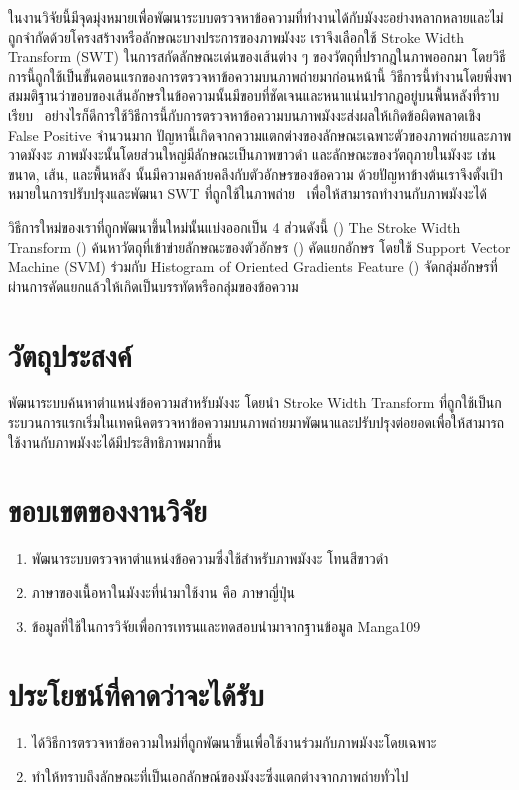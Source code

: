ในงานวิจัยนี้มีจุดมุ่งหมายเพื่อพัฒนาระบบตรวจหาข้อความที่ทำงานได้กับมังงะอย่างหลากหลายและไม่ถูกจำกัดด้วยโครงสร้างหรือลักษณะบางประการของภาพมังงะ เราจึงเลือกใช้ Stroke Width Transform (SWT) ในการสกัดลักษณะเด่นของเส้นต่าง ๆ ของวัตถุที่ปรากฎในภาพออกมา โดยวิธีการนี้ถูกใช้เป็นขั้นตอนแรกของการตรวจหาข้อความบนภาพถ่ายมาก่อนหน้านี้ วิธีการนี้ทำงานโดยพึ่งพาสมมติฐานว่าขอบของเส้นอักษรในข้อความนั้นมีขอบที่ชัดเจนและหนาแน่นปรากฏอยู่บนพื้นหลังที่ราบเรียบ~\cite{5540041} อย่างไรก็ดีการใช้วิธีการนี้กับการตรวจหาข้อความบนภาพมังงะส่งผลให้เกิดข้อผิดพลาดเชิง False Positive จำนวนมาก ปัญหานี้เกิดจากความแตกต่างของลักษณะเฉพาะตัวของภาพถ่ายและภาพวาดมังงะ ภาพมังงะนั้นโดยส่วนใหญ่มีลักษณะเป็นภาพขาวดำ และลักษณะของวัตถุภายในมังงะ เช่น ขนาด, เส้น, และพื้นหลัง นั้นมีความคล้ายคลึงกับตัวอักษรของข้อความ ด้วยปัญหาข้างต้นเราจึงตั้งเป้าหมายในการปรับปรุงและพัฒนา SWT ที่ถูกใช้ในภาพถ่าย~\cite{5540041} เพื่อให้สามารถทำงานกับภาพมังงะได้

วิธีการใหม่ของเราที่ถูกพัฒนาขึ้นใหม่นั้นแบ่งออกเป็น 4 ส่วนดังนี้ () The Stroke Width Transform () ค้นหาวัตถุที่เข้าข่ายลักษณะของตัวอักษร () คัดแยกอักษร โดยใช้ Support Vector Machine (SVM) ร่วมกับ Histogram of Oriented Gradients Feature () จัดกลุ่มอักษรที่ผ่านการคัดแยกแล้วให้เกิดเป็นบรรทัดหรือกลุ่มของข้อความ

\section{วัตถุประสงค์}
พัฒนาระบบค้นหาตำแหน่งข้อความสำหรับมังงะ โดยนำ Stroke Width Transform ที่ถูกใช้เป็นกระบวนการแรกเริ่มในเทคนิคตรวจหาข้อความบนภาพถ่ายมาพัฒนาและปรับปรุงต่อยอดเพื่อให้สามารถใช้งานกับภาพมังงะได้มีประสิทธิภาพมากขึ้น

\section{ขอบเขตของงานวิจัย}
\begin{enumerate}
    \item พัฒนาระบบตรวจหาตำแหน่งข้อความซึ่งใช้สำหรับภาพมังงะ โทนสีขาวดำ
    \item ภาษาของเนื้อหาในมังงะที่นำมาใช้งาน คือ ภาษาญี่ปุ่น
    \item ข้อมูลที่ใช้ในการวิจัยเพื่อการเทรนและทดสอบนำมาจากฐานข้อมูล Manga109
\end{enumerate}

\section{ประโยชน์ที่คาดว่าจะได้รับ}
\begin{enumerate}
    \item ได้วิธีการตรวจหาข้อความใหม่ที่ถูกพัฒนาขึ้นเพื่อใช้งานร่วมกับภาพมังงะโดยเฉพาะ
    \item ทำให้ทราบถึงลักษณะที่เป็นเอกลักษณ์ของมังงะซึ่งแตกต่างจากภาพถ่ายทั่วไป
\end{enumerate}


